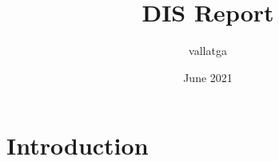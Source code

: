 \documentclass{article}
\title{DIS Report}
\author{vallatga }
\date{June 2021}
\begin{document}
\maketitle

\section{Introduction}
\end{document}
